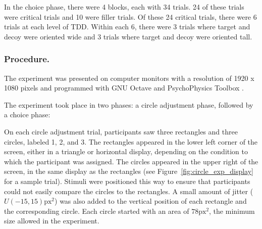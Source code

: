 In the choice phase, there were 4 blocks, each with 34 trials. 24 of these trials were critical trials and 10 were filler trials. Of these 24 critical trials, there were 6 trials at each level of TDD. Within each 6, there were 3 trials where target and decoy were oriented wide and 3 trials where target and decoy were oriented tall. 

\subsubsection{Procedure.}

The experiment was presented on computer monitors with a resolution of 1920 x 1080 pixels and programmed with GNU Octave \parencite{octave} and PsychoPhysics Toolbox \parencite{brainardPsychophysicsToolbox1997}. 

The experiment took place in two phases: a circle adjustment phase, followed by a choice phase: 

On each circle adjustment trial, participants saw three rectangles and three circles, labeled 1, 2, and 3. The rectangles appeared in the lower left corner of the screen, either in a triangle or horizontal display, depending on the condition to which the participant was assigned. The circles appeared in the upper right of the screen, in the same display as the rectangles (see Figure~\ref{fig:circle_exp_display} for a sample trial). Stimuli were positioned this way to ensure that participants could not easily compare the circles to the rectangles. A small amount of jitter ($U(-15,15)\text{px}^2$) was also added to the vertical position of each rectangle and the corresponding circle. Each circle started with an area of $78 \text{px}^2$, the minimum size allowed in the experiment. 

